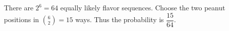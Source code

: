 There are $2^6=64$ equally likely flavor sequences. Choose the two peanut positions in $\binom 62=15$ ways. Thus the probability is $\boxed{\dfrac{15}{64}}$.

